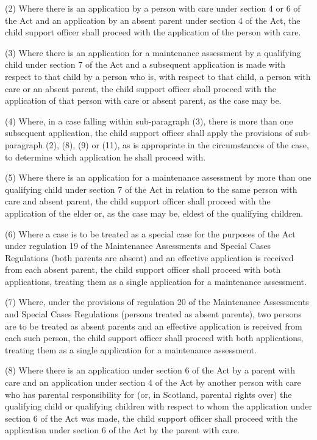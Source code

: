 \documentclass[a4paper]{article}
\begin{document}
(2) Where there is an application by a person with care under section 4 or 6 of the Act and an application by an absent parent under section 4 of the Act, the child support officer shall proceed with the application of the person with care.

(3) Where there is an application for a maintenance assessment by a qualifying child under section 7 of the Act and a subsequent application is made with respect to that child by a person who is, with respect to that child, a person with care or an absent parent, the child support officer shall proceed with the application of that person with care or absent parent, as the case may be.

(4) Where, in a case falling within sub-paragraph (3), there is more than one subsequent application, the child support officer shall apply the provisions of sub-paragraph (2), (8), (9) or (11), as is appropriate in the circumstances of the case, to determine which application he shall proceed with.

(5) Where there is an application for a maintenance assessment by more than one qualifying child under section 7 of the Act in relation to the same person with care and absent parent, the child support officer shall proceed with the application of the elder or, as the case may be, eldest of the qualifying children.

(6) Where a case is to be treated as a special case for the purposes of the Act under regulation 19 of the Maintenance Assessments and Special Cases Regulations (both parents are absent) and an effective application is received from each absent parent, the child support officer shall proceed with both applications, treating them as a single application for a maintenance assessment.

(7) Where, under the provisions of regulation 20 of the Maintenance Assessments and Special Cases Regulations (persons treated as absent parents), two persons are to be treated as absent parents and an effective application is received from each such person, the child support officer shall proceed with both applications, treating them as a single application for a maintenance assessment.

(8) Where there is an application under section 6 of the Act by a parent with care and an application under section 4 of the Act by another person with care who has parental responsibility for (or, in Scotland, parental rights over) the qualifying child or qualifying children with respect to whom the application under section 6 of the Act was made, the child support officer shall proceed with the application under section 6 of the Act by the parent with care.
\end{document}
